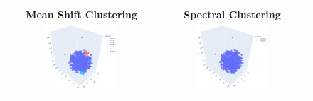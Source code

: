 \begin{figure}
\begin{tabular}{|c|c|}
		\textbf{Mean Shift Clustering} &
		\textbf{Spectral Clustering} \\
		\includegraphics[width=0.5\textwidth]{NOTEBOOK/IMAGENES_CLUSTERING/3_TNSE_Mean_Shift_Clustering} &
		\includegraphics[width=0.5\textwidth]{NOTEBOOK/IMAGENES_CLUSTERING/4_TNSE_Spectral_ Clustering} 
		\\ \hline
	\end{tabular}
\end{figure}

